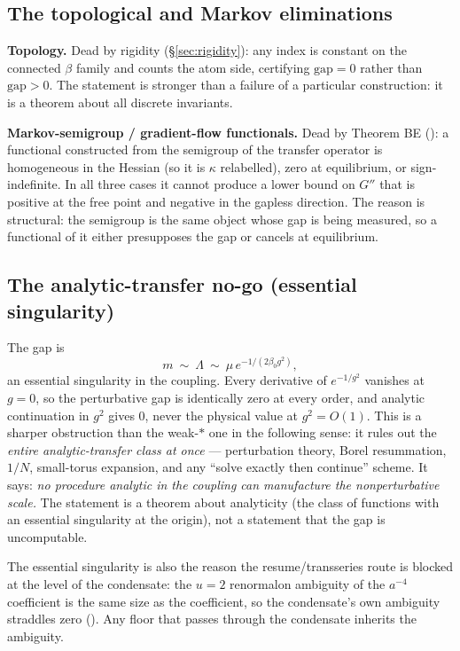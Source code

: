\subsection{The topological and Markov eliminations}

\textbf{Topology.} Dead by rigidity (\S\ref{sec:rigidity}): any index is constant on the
connected $\beta$ family and counts the atom side, certifying $\text{gap}=0$ rather than
$\text{gap}>0$. The statement is stronger than a failure of a particular construction: it is a
theorem about all discrete invariants.

\textbf{Markov-semigroup / gradient-flow functionals.} Dead by Theorem BE
(): a functional constructed from the semigroup of the transfer
operator is homogeneous in the Hessian (so it is $\kappa$ relabelled), zero at equilibrium, or
sign-indefinite. In all three cases it cannot produce a lower bound on $G''$ that is positive at
the free point and negative in the gapless direction. The reason is structural: the semigroup is
the same object whose gap is being measured, so a functional of it either presupposes the gap or
cancels at equilibrium.

\subsection{The analytic-transfer no-go (essential singularity)}
\label{sec:esssing}

The gap is
\begin{equation}
m\ \sim\ \Lambda\ \sim\ \mu\,e^{-1/(2\beta_0g^2)} ,
\label{eq:esssing}
\end{equation}
an essential singularity in the coupling. Every derivative of $e^{-1/g^2}$ vanishes at $g=0$, so
the perturbative gap is identically zero at every order, and analytic continuation in $g^2$ gives
$0$, never the physical value at $g^2=O(1)$. This is a sharper obstruction than the weak-$*$ one
in the following sense: it rules out the \emph{entire analytic-transfer class at once} ---
perturbation theory, Borel resummation, $1/N$, small-torus expansion, and any ``solve exactly
then continue'' scheme. It says: \emph{no procedure analytic in the coupling can manufacture the
nonperturbative scale.} The statement is a theorem about analyticity (the class of functions with
an essential singularity at the origin), not a statement that the gap is uncomputable.

The essential singularity is also the reason the resume/transseries route is blocked at the
level of the condensate: the $u=2$ renormalon ambiguity of the $a^{-4}$ coefficient is the same
size as the coefficient, so the condensate's own ambiguity straddles zero
(). Any floor that passes through the condensate inherits the
ambiguity.

